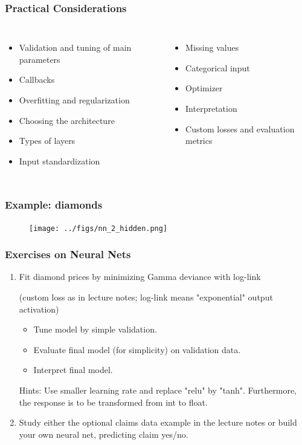 \documentclass[
    utf8,
    aspectratio=169
]{beamer}  %
\begin{document}
\begin{frame}
\frametitle{Practical Considerations}
\begin{columns}
	\begin{itemize}
		\item Validation and tuning of main parameters
		\item Callbacks
		\item Overfitting and regularization
		\item Choosing the architecture
		\item Types of layers
		\item Input standardization
	\end{itemize}

	\begin{itemize}
		\item Missing values
		\item Categorical input
		\item Optimizer
		\item Interpretation
		\item Custom losses and evaluation metrics
	\end{itemize}
\end{columns}
\end{frame}

\begin{frame}
\frametitle{Example: diamonds}
\begin{figure}
	\texttt{[image: ../figs/nn\_2\_hidden.png]}
\end{figure}
\end{frame}

\begin{frame}
	\frametitle{Exercises on Neural Nets}
	\begin{enumerate}
		\item Fit diamond prices by minimizing Gamma deviance with log-link 
		
		(custom loss as in lecture notes; log-link means "exponential" output activation)
		\begin{itemize}
			\item Tune model by simple validation.
			\item Evaluate final model (for simplicity) on validation data.
			\item Interpret final model.
		\end{itemize}
		Hints: Use smaller learning rate and replace "relu" by "tanh". Furthermore, the response is to be transformed from int to float.
		\item Study either the optional claims data example in the lecture notes or build your own neural net, predicting claim yes/no.
	\end{enumerate}
\end{frame}
\end{document}
